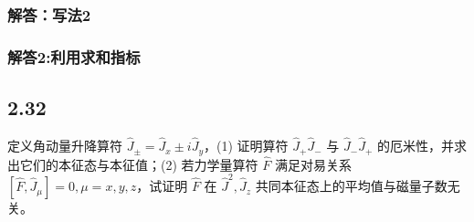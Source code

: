 \subsubsection{解答：写法2}



\subsubsection{解答2:利用求和指标}





\newpage
\subsection{2.32}
定义角动量升降算符 $\hat{J}_{\pm} = \hat{J}_x \pm i \hat{J}_y$，(1) 证明算符 $\hat{J}_+ \hat{J}_- $ 与 $\hat{J}_- \hat{J}_+ $ 的厄米性，并求出它们的本征态与本征值；(2) 若力学量算符 $\hat{F}$ 满足对易关系 $[\hat{F}, \hat{J}_{\mu}] = 0, \mu = x, y, z$，试证明 $\hat{F}$ 在 $\hat{J}^2, \hat{J}_z$ 共同本征态上的平均值与磁量子数无关。


